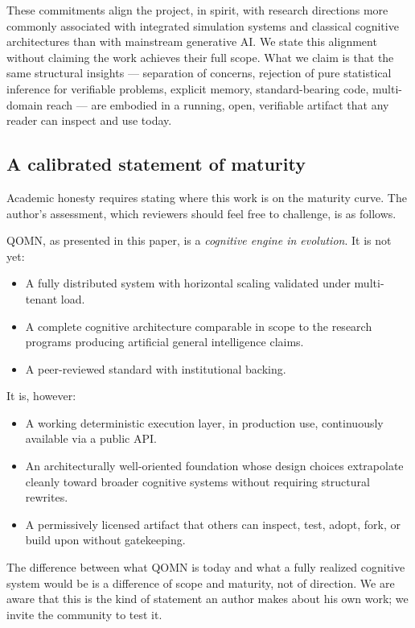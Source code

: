 \documentclass[11pt,a4paper]{article}
\begin{document}
\begin{enumerate}[leftmargin=*]
These commitments align the project, in spirit, with research directions more commonly associated with integrated simulation systems and classical cognitive architectures than with mainstream generative AI. We state this alignment without claiming the work achieves their full scope. What we claim is that the same structural insights --- separation of concerns, rejection of pure statistical inference for verifiable problems, explicit memory, standard-bearing code, multi-domain reach --- are embodied in a running, open, verifiable artifact that any reader can inspect and use today.

\subsection{A calibrated statement of maturity}
\label{sec:maturity}

Academic honesty requires stating where this work is on the maturity curve. The author's assessment, which reviewers should feel free to challenge, is as follows.

QOMN, as presented in this paper, is a \emph{cognitive engine in evolution}. It is not yet:

\begin{itemize}[leftmargin=*]
\item A fully distributed system with horizontal scaling validated under multi-tenant load.
\item A complete cognitive architecture comparable in scope to the research programs producing artificial general intelligence claims.
\item A peer-reviewed standard with institutional backing.
\end{itemize}

It is, however:

\begin{itemize}[leftmargin=*]
\item A working deterministic execution layer, in production use, continuously available via a public API.
\item An architecturally well-oriented foundation whose design choices extrapolate cleanly toward broader cognitive systems without requiring structural rewrites.
\item A permissively licensed artifact that others can inspect, test, adopt, fork, or build upon without gatekeeping.
\end{itemize}

The difference between what QOMN is today and what a fully realized cognitive system would be is a difference of scope and maturity, not of direction. We are aware that this is the kind of statement an author makes about his own work; we invite the community to test it.


\end{enumerate}
\end{document}
